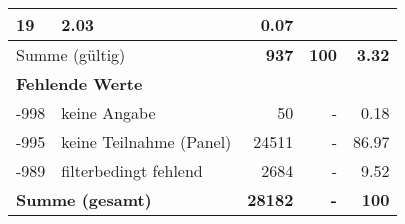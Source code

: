 \begin{longtable}{lXrrr}
       \num{19} &
       \num[round-mode=places,round-precision=2]{2,03} &
         \num[round-mode=places,round-precision=2]{0,07} \\
     \midrule
     \multicolumn{2}{l}{Summe (gültig)} &
       \textbf{\num{937}} &
     \textbf{100} &
       \textbf{\num[round-mode=places,round-precision=2]{3,32}} \\
     \multicolumn{5}{l}{\textbf{Fehlende Werte}}\\
       -998 &
       keine Angabe &
         \num{50} &
        - &
         \num[round-mode=places,round-precision=2]{0,18} \\
       -995 &
       keine Teilnahme (Panel) &
         \num{24511} &
        - &
         \num[round-mode=places,round-precision=2]{86,97} \\
       -989 &
       filterbedingt fehlend &
         \num{2684} &
        - &
         \num[round-mode=places,round-precision=2]{9,52} \\
     \midrule
     \multicolumn{2}{l}{\textbf{Summe (gesamt)}} &
          \textbf{\num{28182}} &
        \textbf{-} &
        \textbf{100} \\
     \bottomrule
     \end{longtable}
     
